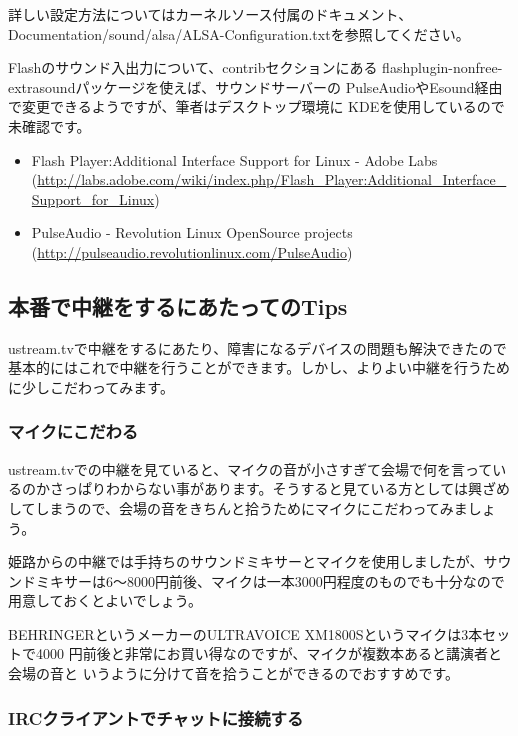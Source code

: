 \documentclass[mingoth,a4paper]{jsarticle}
\begin{document}
詳しい設定方法についてはカーネルソース付属のドキュメント、
Documentation/sound/alsa/ALSA-Configuration.txtを参照してください。

Flashのサウンド入出力について、contribセクションにある
flashplugin-nonfree-extrasoundパッケージを使えば、サウンドサーバーの
PulseAudioやEsound経由で変更できるようですが、筆者はデスクトップ環境に
KDEを使用しているので未確認です。

\begin{itemize}
 \item Flash Player:Additional Interface Support for Linux - Adobe Labs
(\url{http://labs.adobe.com/wiki/index.php/Flash_Player:Additional_Interface_Support_for_Linux})
 \item PulseAudio - Revolution Linux OpenSource projects
(\url{http://pulseaudio.revolutionlinux.com/PulseAudio})
\end{itemize}

\subsection{本番で中継をするにあたってのTips}

ustream.tvで中継をするにあたり、障害になるデバイスの問題も解決できたので
基本的にはこれで中継を行うことができます。しかし、よりよい中継を行うため
に少しこだわってみます。

\subsubsection{マイクにこだわる}

ustream.tvでの中継を見ていると、マイクの音が小さすぎて会場で何を言ってい
るのかさっぱりわからない事があります。そうすると見ている方としては興ざめ
してしまうので、会場の音をきちんと拾うためにマイクにこだわってみましょう。

姫路からの中継では手持ちのサウンドミキサーとマイクを使用しましたが、サウ
ンドミキサーは6〜8000円前後、マイクは一本3000円程度のものでも十分なので
用意しておくとよいでしょう。

BEHRINGERというメーカーのULTRAVOICE XM1800Sというマイクは3本セットで4000
円前後と非常にお買い得なのですが、マイクが複数本あると講演者と会場の音と
いうように分けて音を拾うことができるのでおすすめです。

\subsubsection{IRCクライアントでチャットに接続する}
\end{document}
